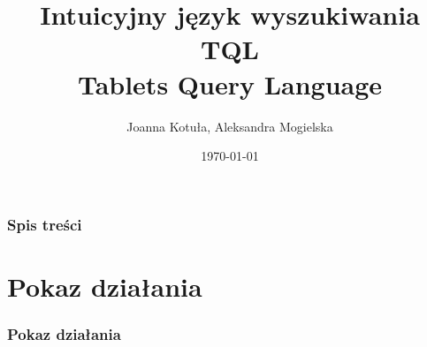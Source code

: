 \documentclass[xcolor=dvipsnames,10pt]{beamer}
\author{Joanna Kotuła, Aleksandra Mogielska}
\institute[...]{Wydział Matematyki, Informatyki i Mechaniki\\
Uniwersytet Warszawski}
\title[Intuicyjny język wyszukiwania TQL (Tablets Query Language)]{\bf  Intuicyjny język wyszukiwania TQL \\
Tablets Query Language}
\date{\today}
\begin{document}
\begin{frame}
     \titlepage
\end{frame}

\begin{frame}
     \frametitle{Spis treści}
     \tableofcontents
\end{frame}
%    
% 
% 




%

 
\section{Pokaz działania}

\begin{frame}
     \frametitle{Pokaz działania}
\end{frame}
\end{document}
